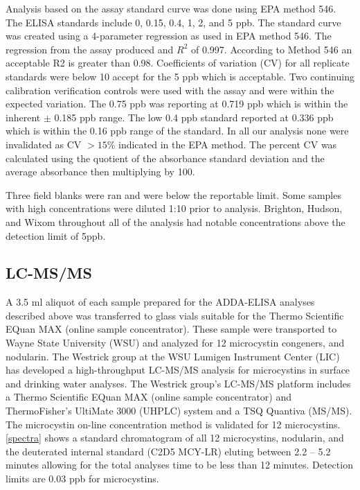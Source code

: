 \documentclass{ou-thesis}
\begin{document}
Analysis based on the assay standard curve was done using EPA method 546. The ELISA standards include 0, 0.15, 0.4, 1, 2, and 5 ppb. The standard curve was created using a 4-parameter regression as used in EPA method 546. The regression from the assay produced and $R^2$ of 0.997. According to Method 546 an acceptable R2 is greater than 0.98.  Coefficients of variation (CV) for all replicate standards were below 10 accept for the 5 ppb which is acceptable. Two continuing calibration verification controls were used with the assay and were within the expected variation. The 0.75 ppb was reporting at 0.719 ppb which is within the inherent $\pm$ 0.185 ppb range. The low 0.4 ppb standard reported at 0.336 ppb which is within the  0.16 ppb range of the standard. In all our analysis none were invalidated as CV $> 15\%$  indicated in the EPA method. The percent CV was calculated using the quotient of the absorbance standard deviation and the average absorbance then multiplying by 100.

Three field blanks were ran and were below the reportable limit. Some samples with high concentrations were diluted 1:10 prior to analysis. Brighton, Hudson, and Wixom throughout all of the analysis had notable concentrations above the detection limit of 5ppb.

\subsection{LC-MS/MS}

A 3.5 ml aliquot of each sample prepared for the ADDA-ELISA analyses described above was transferred to glass vials suitable for the Thermo Scientific EQuan MAX (online sample concentrator).  These sample were transported to Wayne State University (WSU) and analyzed for 12 microcystin congeners, and nodularin.  The Westrick group at the WSU Lumigen Instrument Center (LIC) has developed a high-throughput LC-MS/MS analysis for microcystins in surface and drinking water analyses. The Westrick group’s LC-MS/MS platform includes a Thermo Scientific EQuan MAX (online sample concentrator) and ThermoFisher’s UltiMate 3000 (UHPLC) system and a TSQ Quantiva (MS/MS). The microcystin on-line concentration method is validated for 12 microcystins.  \ref{spectra} shows a standard chromatogram of all 12 microcystins, nodularin, and the deuterated internal standard (C2D5 MCY-LR) eluting between 2.2 – 5.2 minutes allowing for the total analyses time to be less than 12 minutes.  Detection limits are 0.03 ppb for microcystins.
\end{document}
